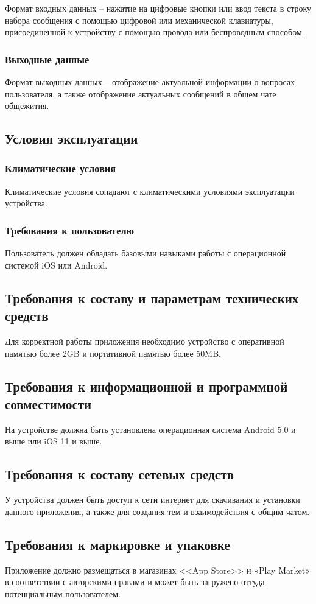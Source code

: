 Формат входных данных -- нажатие на цифровые кнопки или ввод текста в строку набора сообщения с помощью цифровой или механической клавиатуры, присоединенной к устройству с помощью провода или беспроводным способом.

\subsubsection{Выходные данные}

Формат выходных данных -- отображение актуальной информации о вопросах пользователя, а также отображение актуальных сообщений в общем чате общежития.

\subsection{Условия эксплуатации}

\subsubsection{Климатические условия}

Климатические условия сопадают с климатическими условиями эксплуатации устройства.

\subsubsection{Требования к пользователю}

Пользователь должен обладать базовыми навыками работы с операционной системой iOS или Android.

\subsection{Требования к составу и параметрам технических средств}

Для корректной работы приложения необходимо устройство с оперативной памятью более 2GB и портативной памятью более 50MB.

\subsection{Требования к информационной и программной совместимости}

На устройстве должна быть установлена операционная система Android 5.0 и выше или iOS 11 и выше.

\subsection{Требования к составу сетевых средств}

У устройства должен быть доступ к сети интернет для скачивания и установки данного приложения, а также для создания тем и взаимодействия с общим чатом.

\subsection{Требования к маркировке и упаковке}

Приложение должно размещаться в магазинах <<App Store>> и «Play Market» в соответствии с авторскими правами и может быть загружено оттуда потенциальным пользователем.